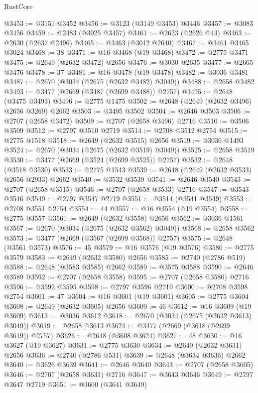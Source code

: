 \begin{lexlean}{RustCore}
\begin{coremodule}
@3453 := @3151 @3452
@3456 := @3123 (@3149 @3453) @3446
@3457 := @3083 @3456
@3459 := @2483 (@3025 @3457)
@3461 := @2623 (@2626 @44)
@3463 := @2630 (@2637 @2496)
@3465 := @3463 (@3012 @2640)
@3467 := @3461 @3465 @3024
@3468 := 38
@3471 := @16 @3468 (@19 @3468)
@3472 := @2775 @3471
@3475 := @2649 (@2632 @3472) @2656
@3476 := @3030 @2635
@3477 := @2665 @3476
@3478 := 37
@3481 := @16 @3478 (@19 @3478)
@3482 := @3036 @3481
@3487 := @2670 (@3034 (@2675 (@2632 @3482) @3049))
@3488 := @2658 @3482
@3493 := @3477 (@2669 (@3487 (@2699 @3488)) @2757)
@3495 := @2648 (@3475 @3493)
@3496 := @2775 @1475
@3502 := @2648 (@2649 (@2632 @3496) @2656 @3269) @2662
@3503 := @3495 @3502
@3504 := @2646 @3503
@3506 := @2707 (@2658 @3472)
@3509 := @2707 (@2658 @3496) @2716
@3510 := @3506 @3509
@3512 := @2797 @3510 @2719
@3514 := @2708 @3512 @2754
@3515 := @2775 @1518
@3518 := @2649 (@2632 @3515) @2656
@3519 := @3036 @1493
@3524 := @2670 (@3034 (@2675 (@2632 @3519) @3049))
@3525 := @2658 @3519
@3530 := @3477 (@2669 (@3524 (@2699 @3525)) @2757)
@3532 := @2648 (@3518 @3530)
@3533 := @2775 @1543
@3539 := @2648 (@2649 (@2632 @3533) @2656 @2933) @2662
@3540 := @3532 @3539
@3541 := @2646 @3540
@3543 := @2707 (@2658 @3515)
@3546 := @2707 (@2658 @3533) @2716
@3547 := @3543 @3546
@3549 := @2797 @3547 @2719
@3551 := @3514 (@3541 @3549)
@3553 := @2708 @3551 @2754
@3554 := 44
@3557 := @16 @3554 (@19 @3554)
@3558 := @2775 @3557
@3561 := @2649 (@2632 @3558) @2656
@3562 := @3036 @1561
@3567 := @2670 (@3034 (@2675 (@2632 @3562) @3049))
@3568 := @2658 @3562
@3573 := @3477 (@2669 (@3567 (@2699 @3568)) @2757)
@3575 := @2648 (@3561 @3573)
@3576 := 45
@3579 := @16 @3576 (@19 @3576)
@3580 := @2775 @3579
@3583 := @2649 (@2632 @3580) @2656
@3585 := @2740 (@2786 @519)
@3588 := @2648 (@3583 @3585) @2662
@3589 := @3575 @3588
@3590 := @2646 @3589
@3592 := @2707 (@2658 @3558)
@3595 := @2707 (@2658 @3580) @2716
@3596 := @3592 @3595
@3598 := @2797 @3596 @2719
@3600 := @2708 @3598 @2754
@3601 := 47
@3604 := @16 @3601 (@19 @3601)
@3605 := @2775 @3604
@3608 := @2649 (@2632 @3605) @2656
@3609 := 46
@3612 := @16 @3609 (@19 @3609)
@3613 := @3036 @3612
@3618 := @2670 (@3034 (@2675 (@2632 @3613) @3049))
@3619 := @2658 @3613
@3624 := @3477 (@2669 (@3618 (@2699 @3619)) @2757)
@3626 := @2648 (@3608 @3624)
@3627 := 48
@3630 := @16 @3627 (@19 @3627)
@3631 := @2775 @3630
@3634 := @2649 (@2632 @3631) @2656
@3636 := @2740 (@2786 @531)
@3639 := @2648 (@3634 @3636) @2662
@3640 := @3626 @3639
@3641 := @2646 @3640
@3643 := @2707 (@2658 @3605)
@3646 := @2707 (@2658 @3631) @2716
@3647 := @3643 @3646
@3649 := @2797 @3647 @2719
@3651 := @3600 (@3641 @3649)

\end{coremodule}
\end{lexlean}
